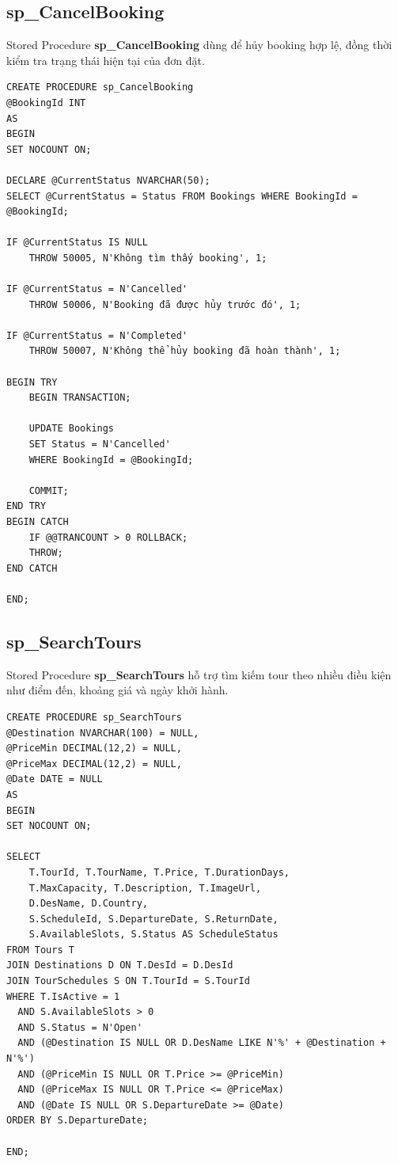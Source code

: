 \subsection{sp\_CancelBooking}

Stored Procedure \textbf{sp\_CancelBooking} dùng để hủy booking hợp lệ, đồng thời kiểm tra trạng thái hiện tại của đơn đặt.

\begin{lstlisting}[style=sql, caption={sp\_CancelBooking}]
CREATE PROCEDURE sp_CancelBooking
@BookingId INT
AS
BEGIN
SET NOCOUNT ON;

DECLARE @CurrentStatus NVARCHAR(50);
SELECT @CurrentStatus = Status FROM Bookings WHERE BookingId = @BookingId;

IF @CurrentStatus IS NULL
    THROW 50005, N'Không tìm thấy booking', 1;

IF @CurrentStatus = N'Cancelled'
    THROW 50006, N'Booking đã được hủy trước đó', 1;

IF @CurrentStatus = N'Completed'
    THROW 50007, N'Không thể hủy booking đã hoàn thành', 1;

BEGIN TRY
    BEGIN TRANSACTION;

    UPDATE Bookings
    SET Status = N'Cancelled'
    WHERE BookingId = @BookingId;

    COMMIT;
END TRY
BEGIN CATCH
    IF @@TRANCOUNT > 0 ROLLBACK;
    THROW;
END CATCH

END;
\end{lstlisting}

\subsection{sp\_SearchTours}

Stored Procedure \textbf{sp\_SearchTours} hỗ trợ tìm kiếm tour theo nhiều điều kiện như điểm đến, khoảng giá và ngày khởi hành.

\begin{lstlisting}[style=sql, caption={sp\_SearchTours}]
CREATE PROCEDURE sp_SearchTours
@Destination NVARCHAR(100) = NULL,
@PriceMin DECIMAL(12,2) = NULL,
@PriceMax DECIMAL(12,2) = NULL,
@Date DATE = NULL
AS
BEGIN
SET NOCOUNT ON;

SELECT
    T.TourId, T.TourName, T.Price, T.DurationDays,
    T.MaxCapacity, T.Description, T.ImageUrl,
    D.DesName, D.Country,
    S.ScheduleId, S.DepartureDate, S.ReturnDate,
    S.AvailableSlots, S.Status AS ScheduleStatus
FROM Tours T
JOIN Destinations D ON T.DesId = D.DesId
JOIN TourSchedules S ON T.TourId = S.TourId
WHERE T.IsActive = 1
  AND S.AvailableSlots > 0
  AND S.Status = N'Open'
  AND (@Destination IS NULL OR D.DesName LIKE N'%' + @Destination + N'%')
  AND (@PriceMin IS NULL OR T.Price >= @PriceMin)
  AND (@PriceMax IS NULL OR T.Price <= @PriceMax)
  AND (@Date IS NULL OR S.DepartureDate >= @Date)
ORDER BY S.DepartureDate;

END;
\end{lstlisting}

